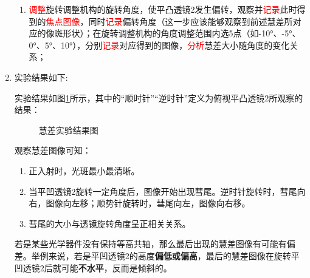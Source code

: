 \documentclass[dvipsnames, svgnames,a4paper,11pt]{article}
\begin{document}
\begin{enumerate}[label=\roman*.]
\begin{enumerate}
				\item \textcolor{red}{调整}旋转调整机构的旋转角度，使平凸透镜2发生偏转，观察并\textcolor{red}{记录}此时得到的\textcolor{red}{焦点图像}，同时\textcolor{red}{记录}偏转角度（这一步应该能够观察到前述慧差所对应的像斑形状）；在旋转调整机构的角度调整范围内选5点（如-10°、-5°、0°、5°、10°），分别\textcolor{red}{记录}对应得到的图像，\textcolor{red}{分析}慧差大小随角度的变化关系；
			\end{enumerate}

		\item 实验结果如下:
		
			实验结果如图\ref{fig:graph10}所示，其中的“顺时针”“逆时针”定义为俯视平凸透镜2所观察的结果：

			\begin{figure}[htbp]
				\centering
				\quad
				\quad
				\quad
				\quad
				\quad
				\quad
				\quad
				\quad
				\quad
				\caption{慧差实验结果图}
				\label{fig:graph10}
			\end{figure}
			
			观察慧差图像可知：
			\begin{enumerate}
				\item 正入射时，光斑最小最清晰。
				\item 当平凹透镜2旋转一定角度后，图像开始出现彗尾。逆时针旋转时，彗尾向右，图像向左移；顺势针旋转时，彗尾向左，图像向右移。
				\item 彗尾的大小与透镜旋转角度呈正相关关系。
			\end{enumerate}
		
			若是某些光学器件没有保持等高共轴，那么最后出现的慧差图像有可能有偏差。举例来说，若是平凹透镜2的高度\textbf{偏低或偏高}，最后的慧差图像在旋转平凹透镜2后就可能\textbf{不水平}，反而是倾斜的。
	
	\end{enumerate}
	
\end{document}

